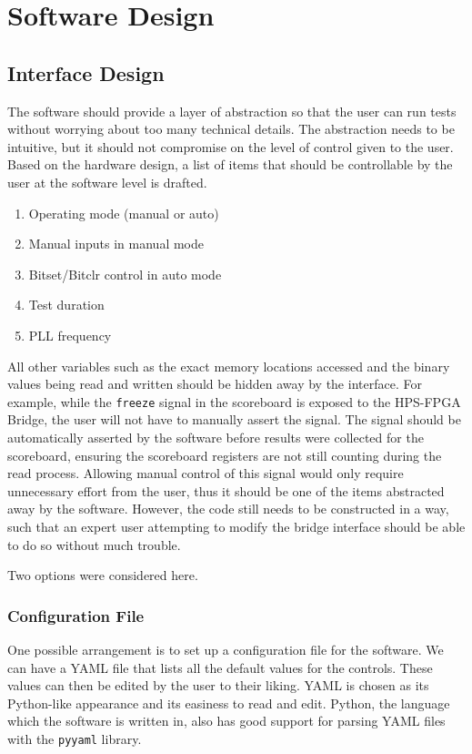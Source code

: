 \chapter{Software Design}

\section{Interface Design}
The software should provide a layer of abstraction so that the user can run tests without worrying about too many technical details.
The abstraction needs to be intuitive, but it should not compromise on the level of control given to the user.
Based on the hardware design, a list of items that should be controllable by the user at the software level is drafted.

\begin{enumerate}
  \setlength\itemsep{0pt}
  \item Operating mode (manual or auto)
  \item Manual inputs in manual mode
  \item Bitset/Bitclr control in auto mode
  \item Test duration
  \item PLL frequency
\end{enumerate}

All other variables such as the exact memory locations accessed and the binary values being read and written should be hidden away by the interface.
For example, while the \texttt{freeze} signal in the scoreboard is exposed to the HPS-FPGA Bridge, the user will not have to manually assert the signal.
The signal should be automatically asserted by the software before results were collected for the scoreboard, ensuring the scoreboard registers are not still counting during the read process.
Allowing manual control of this signal would only require unnecessary effort from the user, thus it should be one of the items abstracted away by the software.
However, the code still needs to be constructed in a way, such that an expert user attempting to modify the bridge interface should be able to do so without much trouble.

Two options were considered here.

\subsection{Configuration File}
One possible arrangement is to set up a configuration file for the software.
We can have a YAML file that lists all the default values for the controls.
These values can then be edited by the user to their liking.
YAML is chosen as its Python-like appearance and its easiness to read and edit.
Python, the language which the software is written in, also has good support for parsing YAML files with the \texttt{pyyaml} library.

